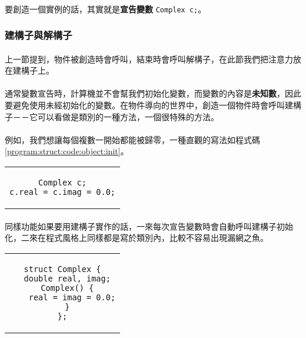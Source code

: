 \documentclass[12pt,a4paper,oneside]{report}
\begin{document}
\begin{CJK}{UTF8}{bkai}
\paragraph{}要創造一個實例的話，其實就是\textbf{宣告變數} \lstinline!Complex c;!。

\subsubsection{建構子與解構子}

\paragraph{}上一節提到，物件被創造時會呼叫，結束時會呼叫解構子，在此節我們把注意力放在建構子上。
\paragraph{}通常變數宣告時，計算機並不會幫我們初始化變數，而變數的內容是\textbf{未知數}，因此要避免使用未經初始化的變數。在物件導向的世界中，創造一個物件時會呼叫建構子－－它可以看做是類別的一種方法，一個很特殊的方法。
\paragraph{}例如，我們想讓每個複數一開始都能被歸零，一種直觀的寫法如程式碼 \ref{program:struct:code:object:init}。

\begin{code}[h!]
\centering
\begin{tabular}{c}
\begin{lstlisting}
Complex c;
c.real = c.imag = 0.0;
\end{lstlisting}
\end{tabular}
\caption{初始化 \lstinline!Complex! 物件}
\label{program:struct:code:object:init}
\end{code}

\paragraph{}同樣功能如果要用建構子實作的話，一來每次宣告變數時會自動呼叫建構子初始化，二來在程式風格上同樣都是寫於類別內，比較不容易出現漏網之魚。

\begin{code}[h!]
\centering
\begin{tabular}{c}
\begin{lstlisting}
struct Complex {
  double real, imag;
  Complex() {
    real = imag = 0.0;
  }
};
\end{lstlisting}
\end{tabular}
\caption{\lstinline!Complex! 建構子}
\label{program:struct:code:object:constructor}
\end{code}


\end{CJK}
\end{document}
